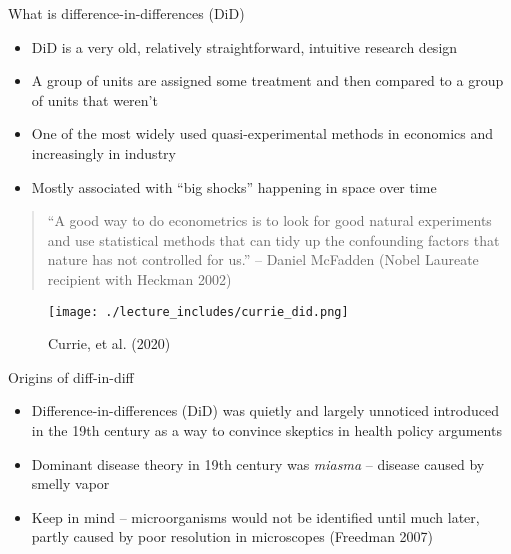 \documentclass{beamer}
\begin{document}
\begin{frame}{What is difference-in-differences (DiD)}

\begin{itemize}
\item DiD is a very old, relatively straightforward, intuitive research design
\item A group of units are assigned some treatment and then compared to a group of units that weren't
\item One of the most widely used quasi-experimental methods in economics and increasingly in industry
\item Mostly associated with ``big shocks'' happening in space over time
\end{itemize}


\begin{quote}
``A good way to do econometrics is to look for good natural experiments and use statistical methods that can tidy up the confounding factors that nature has not controlled for us.'' -- Daniel McFadden (Nobel Laureate recipient with Heckman 2002)
\end{quote}

\end{frame}


\begin{frame}

	\begin{figure}
	\caption{Currie, et al. (2020)}
	\texttt{[image: ./lecture\_includes/currie\_did.png]}
	\end{figure}


\end{frame}













\begin{frame}{Origins of diff-in-diff}

\begin{itemize}
\item Difference-in-differences (DiD) was quietly and largely unnoticed introduced in the 19th century as a way to convince skeptics in health policy arguments
\item Dominant disease theory in 19th century was \emph{miasma} -- disease caused by smelly vapor
\item Keep in mind -- microorganisms would not be identified until much later, partly caused by poor resolution in microscopes (Freedman 2007)

\end{itemize}

\end{frame}
\end{document}

